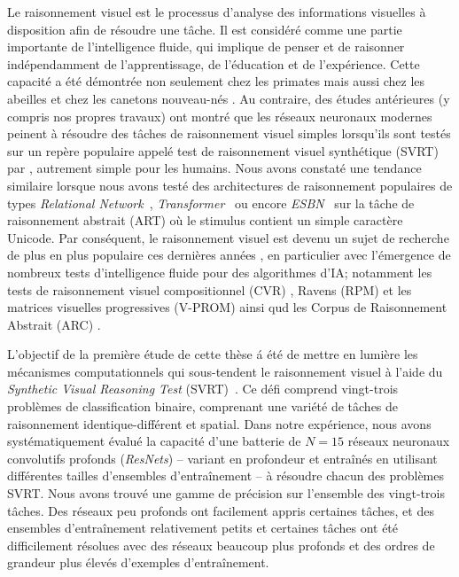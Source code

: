 \color{black}
Le raisonnement visuel est le processus d'analyse des informations visuelles à disposition afin de r\'esoudre une tâche. Il est consid\'er\'e comme une partie importante de l'intelligence fluide, qui implique de penser et de raisonner ind\'ependamment de l'apprentissage, de l'\'education et de l'exp\'erience. Cette capacit\'e a \'et\'e d\'emontr\'ee non seulement chez les primates \citep{gentner2021learning} mais aussi chez les abeilles \citep{giurfa2001concepts} et chez les canetons nouveau-n\'es \citep{martinho2016ducklings}. Au contraire, des \'etudes ant\'erieures \citep{Puebla2021.04.06.438551,kim2018not,ricci37same,messina2021solving} (y compris nos propres travaux) ont montr\'e que les r\'eseaux neuronaux modernes peinent \`a r\'esoudre des tâches de raisonnement visuel simples lorsqu'ils sont test\'es sur un rep\`ere populaire appel\'e test de raisonnement visuel synth\'etique (SVRT) par \citet{fleuret2011comparing}, autrement simple pour les humains. Nous avons constat\'e une tendance similaire lorsque nous avons test\'e des architectures de raisonnement populaires de types \textit{Relational Network}~\citep{santoro2017simple}, \textit{Transformer}~\citep{vaswani2017attention} ou encore \textit{ESBN}~\citep{Webb2021EmergentST} sur la tâche de raisonnement abstrait (ART) où le stimulus contient un simple caract\`ere Unicode. Par cons\'equent, le raisonnement visuel est devenu un sujet de recherche de plus en plus populaire ces derni\`eres ann\'ees , en particulier avec l'\'emergence de nombreux tests d'intelligence fluide pour des algorithmes d'IA;  notamment les tests de raisonnement visuel compositionnel (CVR) \citep{zerroug2022benchmark}, Ravens (RPM) \citep{barrett2018measuring,zhang2019raven} et les matrices visuelles progressives (V-PROM) \citep{barrett2018measuring,teney2020v} ainsi qud les Corpus de Raisonnement Abstrait (ARC) \citep{chollet2019measure}. 

L'objectif de la premi\`ere \'etude de cette th\`ese \' a été de mettre en lumi\`ere les m\'ecanismes computationnels qui sous-tendent le raisonnement visuel \`a l'aide du \textit{Synthetic Visual Reasoning Test} (SVRT)~\citep{fleuret2011comparing}. Ce défi comprend vingt-trois problèmes de classification binaire, comprenant une vari\'et\'e de tâches de raisonnement identique-diff\'erent et spatial.  Dans notre exp\'erience, nous avons syst\'ematiquement \'evalu\'e la capacit\'e d'une batterie de $N=15$ r\'eseaux neuronaux convolutifs profonds (\textit{ResNets}) -- variant en profondeur et entraîn\'es en utilisant diff\'erentes tailles d'ensembles d'entraînement -- \`a r\'esoudre chacun des probl\`emes SVRT. Nous avons trouv\'e une gamme de précision sur l'ensemble des vingt-trois tâches. Des r\'eseaux peu profonds ont facilement appris certaines tâches, et des ensembles d'entraînement relativement petits et certaines tâches ont \'et\'e difficilement r\'esolues avec des r\'eseaux beaucoup plus profonds et des ordres de grandeur plus \'elev\'es d'exemples d'entraînement. 


